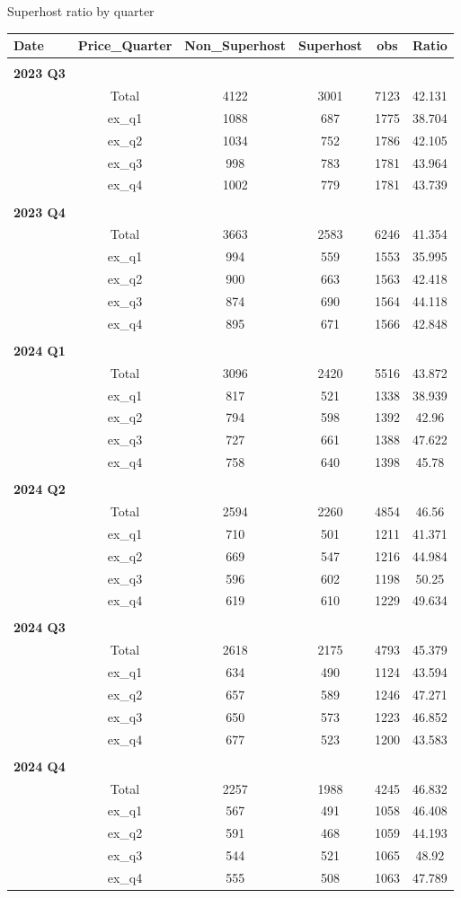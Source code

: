 \begin{table}[]
 \TABLE 
 {Superhost ratio by quarter \label{Sup_ratio}} {\begin{tabular}{lccccc}
\hline
 Date & Price\_Quarter & Non\_Superhost& Superhost &obs &Ratio \\ \hline
 \\ 
 \textbf{2023 Q3} \\ 
 &Total&4122&3001&7123&42.131\\ 
 &ex_q1&1088&687&1775&38.704\\ 
 &ex_q2&1034&752&1786&42.105\\ 
 &ex_q3&998&783&1781&43.964\\ 
 &ex_q4&1002&779&1781&43.739\\ 
 \\ 
 \textbf{2023 Q4} \\ 
 &Total&3663&2583&6246&41.354\\ 
 &ex_q1&994&559&1553&35.995\\ 
 &ex_q2&900&663&1563&42.418\\ 
 &ex_q3&874&690&1564&44.118\\ 
 &ex_q4&895&671&1566&42.848\\ 
 \\ 
 \textbf{2024 Q1} \\ 
 &Total&3096&2420&5516&43.872\\ 
 &ex_q1&817&521&1338&38.939\\ 
 &ex_q2&794&598&1392&42.96\\ 
 &ex_q3&727&661&1388&47.622\\ 
 &ex_q4&758&640&1398&45.78\\ 
 \\ 
 \textbf{2024 Q2} \\ 
 &Total&2594&2260&4854&46.56\\ 
 &ex_q1&710&501&1211&41.371\\ 
 &ex_q2&669&547&1216&44.984\\ 
 &ex_q3&596&602&1198&50.25\\ 
 &ex_q4&619&610&1229&49.634\\ 
 \\ 
 \textbf{2024 Q3} \\ 
 &Total&2618&2175&4793&45.379\\ 
 &ex_q1&634&490&1124&43.594\\ 
 &ex_q2&657&589&1246&47.271\\ 
 &ex_q3&650&573&1223&46.852\\ 
 &ex_q4&677&523&1200&43.583\\ 
 \\ 
 \textbf{2024 Q4} \\ 
 &Total&2257&1988&4245&46.832\\ 
 &ex_q1&567&491&1058&46.408\\ 
 &ex_q2&591&468&1059&44.193\\ 
 &ex_q3&544&521&1065&48.92\\ 
 &ex_q4&555&508&1063&47.789\\ 
\hline 
 \end{tabular}}{\textit{}}
\end{table}
